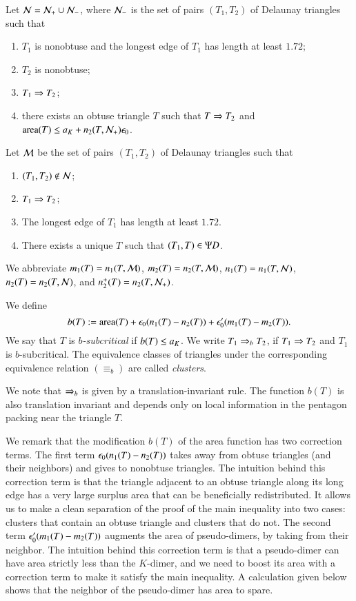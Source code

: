 Let $\mathcal N = \mathcal N_+ \cup \mathcal N_-$, where $\mathcal N_-$ is the set of pairs $(T_1,T_2)$ of Delaunay triangles such that
\begin{enumerate}
\item $T_1$ is nonobtuse and the longest edge of $T_1$ has length at least $1.72$;
\item $T_2$ is nonobtuse;
\item $T_1\Rightarrow T_2$;
\item there exists an obtuse triangle $T$ such that $T\Rightarrow T_2$ and 
${\operatorname{area}}(T) \le a_K+  n_2(T,\mathcal N_+)\epsilon_0$.
\end{enumerate}

Let $\mathcal M$ be the set of pairs $(T_1,T_2)$ of Delaunay triangles such that
\begin{enumerate}
\item $(T_1,T_2)\not\in \mathcal N$;
\item $T_1\Rightarrow T_2$;
\item The longest edge of $T_1$ has length  at least $1.72$.
\item There exists a unique $T$ such that $(T_1,T)\in \Psi D$.
\end{enumerate}

We abbreviate $m_1(T) = n_1(T,\mathcal M)$, $m_2(T) = n_2(T,\mathcal M)$, $n_1(T) = n_1(T,\mathcal N)$, $n_2(T) = n_2(T,\mathcal N)$,
and $n_2^+(T) = n_2(T,\mathcal N_+)$.

We define
\[
b(T) := {\operatorname{area}}(T) + \epsilon_0 (n_1(T) - n_2(T)) + \epsilon_0' (m_1(T) - m_2(T)).
\]
We say that $T$ is {\it $b$-subcritical} if $b(T) \le a_K$.  We write
$T_1\Rightarrow_{b} T_2$, if $T_1\Rightarrow T_2$ and $T_1$ is $b$-subcritical.
The equivalence classes of triangles under the corresponding
equivalence relation $(\equiv_b)$ are called {\it clusters}.

We note that $\Rightarrow_{b}$ is given by a translation-invariant rule.  The function $b(T)$ is also
translation invariant and depends only on local information in the pentagon packing near  the triangle $T$.

We remark that the modification $b(T)$ of the area function has two correction terms.
The first term $\epsilon_0 (n_1(T) - n_2(T))$ takes away from obtuse triangles (and their neighbors) and gives 
 to nonobtuse triangles.  
The intuition behind this correction term is that the triangle adjacent to an obtuse triangle along its long edge
has a very large surplus area that can be beneficially redistributed.  It allows us to make a clean separation of
the proof of the main inequality into two cases: clusters that contain an obtuse triangle and clusters that do not.
The second term $\epsilon_0' (m_1(T) - m_2(T))$ augments the area of pseudo-dimers, by taking from
their neighbor.   The intuition behind this correction term is that a pseudo-dimer can have area strictly less than
the $K$-dimer, and we need to boost its area with a correction term to make it satisfy the main
inequality.  A calculation given below shows that the neighbor of the pseudo-dimer has area to spare.

